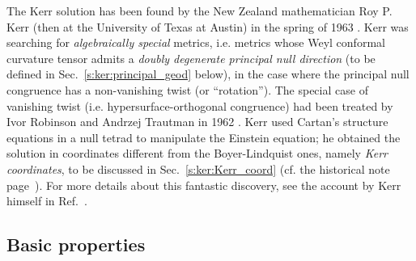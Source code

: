 \begin{hist}
The Kerr solution has been found by the New Zealand mathematician Roy P. Kerr (then at the University of Texas at Austin) in the spring of 1963
\cite{Kerr63}. Kerr was searching for \emph{algebraically special} metrics, i.e. metrics whose Weyl conformal curvature
tensor admits a \emph{doubly degenerate principal null direction} (to be defined
in Sec.~\ref{s:ker:principal_geod} below), in the case where the
principal null congruence has a non-vanishing twist (or ``rotation''). The special case of vanishing twist (i.e. hypersurface-orthogonal
congruence) had been treated by Ivor Robinson and
Andrzej Trautman in 1962 \cite{RobinT62}.
Kerr used
Cartan's structure equations in a null tetrad
to manipulate the Einstein equation; he obtained the solution in coordinates different from the Boyer-Lindquist ones, namely \emph{Kerr coordinates},
to be discussed in Sec.~\ref{s:ker:Kerr_coord} (cf. the historical note page~\pageref{h:ker:Kerr_coord}). For more details about this fantastic discovery, see the
account by Kerr himself in Ref.~\cite{Kerr09}.
\end{hist}

\subsection{Basic properties} \label{s:ker:basic_prop}

